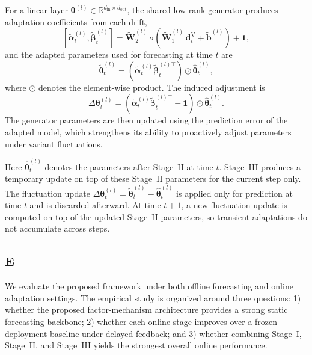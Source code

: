 ﻿\documentclass[journal]{IEEEtran}
\begin{document}
For a linear layer $\boldsymbol{\theta}^{(l)}\in\mathbb{R}^{d_{\mathrm{in}}\times d_{\mathrm{out}}}$, the shared low-rank generator produces adaptation coefficients from each drift,
\begin{equation}
\left[\tilde{\boldsymbol{\alpha}}^{(l)}_t,\tilde{\boldsymbol{\beta}}^{(l)}_t\right]
=\tilde{\mathbf{W}}^{(l)}_2\,\sigma\!\left(\tilde{\mathbf{W}}^{(l)}_1\,\mathbf{d}^{\mathrm{V}}_t+\tilde{\mathbf{b}}^{(l)}\right)+\mathbf{1},
\end{equation}
and the adapted parameters used for forecasting at time $t$ are
\begin{equation}
\tilde{{\boldsymbol{\theta}}}^{(l)}_t=\left(\tilde{\boldsymbol{\alpha}}^{(l)}_t\tilde{\boldsymbol{\beta}}^{(l)\top}_t\right)\odot \widehat{\boldsymbol{\theta}}^{(l)}_t,
\end{equation}
where $\odot$ denotes the element-wise product. The induced adjustment is
\begin{equation}
\Delta\boldsymbol{\theta}^{(l)}_t=\left(\tilde{\boldsymbol{\alpha}}^{(l)}_t\tilde{\boldsymbol{\beta}}^{(l)\top}_t-\mathbf{1}\right)\odot \widehat{\boldsymbol{\theta}}^{(l)}_t.
\end{equation}
The generator parameters are then updated using the prediction error of the adapted model, which strengthens its ability to proactively adjust parameters under variant fluctuations. 

Here $\widehat{\boldsymbol{\theta}}^{(l)}_t$ denotes the parameters after Stage~II at time $t$. Stage~III produces a temporary update on top of these Stage~II parameters for the current step only. The fluctuation update $\Delta\boldsymbol{\theta}^{(l)}_t=\tilde{\boldsymbol{\theta}}^{(l)}_t-\widehat{\boldsymbol{\theta}}^{(l)}_t$ is applied only for prediction at time $t$ and is discarded afterward. At time $t+1$, a new fluctuation update is computed on top of the updated Stage~II parameters, so transient adaptations do not accumulate across steps.

\subsection{E}
We evaluate the proposed framework under both offline forecasting and online adaptation settings. The empirical study is organized around three questions: 1) whether the proposed factor-mechanism architecture provides a strong static forecasting backbone; 2) whether each online stage improves over a frozen deployment baseline under delayed feedback; and 3) whether combining Stage~I, Stage~II, and Stage~III yields the strongest overall online performance.
\end{document}

